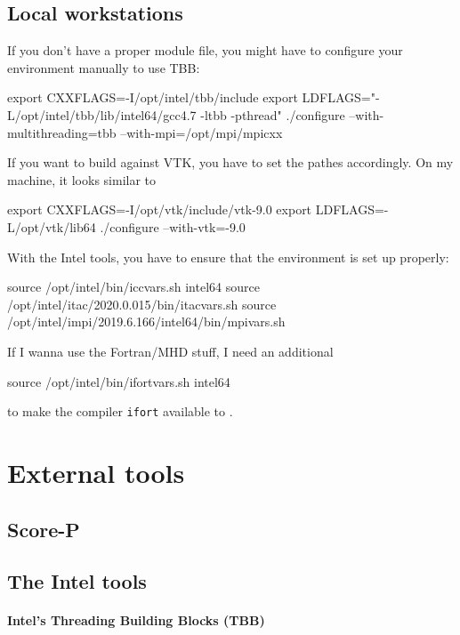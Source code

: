 \subsection{Local workstations}



If you don't have a proper module file, you might have to configure your environment manually to use TBB:
\begin{code}
 export CXXFLAGS=-I/opt/intel/tbb/include
 export LDFLAGS="-L/opt/intel/tbb/lib/intel64/gcc4.7 -ltbb -pthread"
 ./configure --with-multithreading=tbb --with-mpi=/opt/mpi/mpicxx
\end{code}


If you want to build against VTK, you have to set the pathes accordingly. 
On my machine, it looks similar to
\begin{code}
 export CXXFLAGS=-I/opt/vtk/include/vtk-9.0
 export LDFLAGS=-L/opt/vtk/lib64
 ./configure --with-vtk=-9.0
\end{code}


With the Intel tools, you have to ensure that the environment is set up 
properly:
\begin{code}
source /opt/intel/bin/iccvars.sh intel64
source /opt/intel/itac/2020.0.015/bin/itacvars.sh
source /opt/intel/impi/2019.6.166/intel64/bin/mpivars.sh
\end{code}
\label{label:supercomputer:Intel-scripts}


If I wanna use the Fortran/MHD stuff, I need an additional
\begin{code}
source /opt/intel/bin/ifortvars.sh intel64
\end{code}
to make the compiler \texttt{ifort} available to \Peano.



\section{External tools}


\subsection{Score-P}


\subsection{The Intel tools}
\label{section:supercomputers:IntelTools}

\paragraph{Intel's Threading Building Blocks (TBB)}

